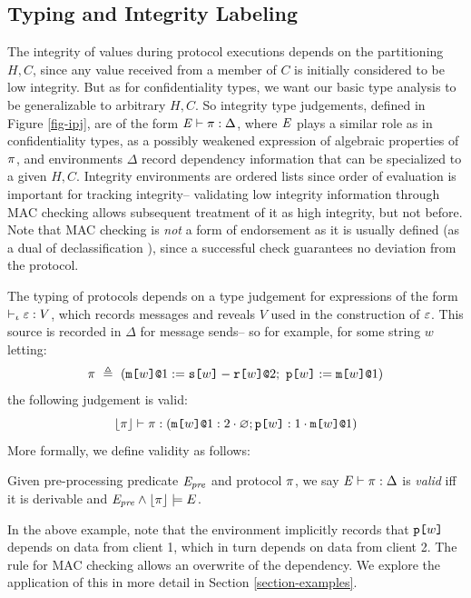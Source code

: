 \subsection{Typing and Integrity Labeling}

The integrity of values during protocol executions depends on the
partitioning $H,C$, since any value received from a member of $C$ is
initially considered to be low integrity. But as for confidentiality
types, we want our basic type analysis to be generalizable to
arbitrary $H,C$. So integrity type judgements, defined in Figure
\ref{fig-ipj}, are of the form $\mathit{E} \vdash \pi : \Delta$, where
$\mathit{E}$ plays a similar role as in confidentiality types, as a possibly
weakened expression of algebraic properties of $\pi$, and
environments $\Delta$ record dependency information that can be
specialized to a given $H,C$. Integrity environments are ordered lists
since order of evaluation is important for tracking integrity--
validating low integrity information through MAC checking allows
subsequent treatment of it as high integrity, but not before. Note
that MAC checking is \emph{not} a form of endorsement as it is usually
defined (as a dual of declassification
\cite{sabelfeld2009declassification}), since a successful check
guarantees no deviation from the protocol.

The typing of protocols depends on a type judgement for expressions
of the form $\vdash_{\iota} \varepsilon : V$, which records
messages and reveals $V$ used in the construction of $\varepsilon$.
This source is recorded in $\Delta$ for message sends-- so for
example, for some string $w$ letting:
$$
\prog\ \defeq\ (\xassign{\mx{w}{1}}{\secret{w} - \flip{w}}{2};\ \rvl{w} := \mx{w}{1})
$$
the following judgement is valid:
$$
\lfloor \pi \rfloor \vdash \pi : (\texttt{m[}w\texttt{]}\texttt{@}1 : 2 \cdot \varnothing; \texttt{p[}w\texttt{]} : 1 \cdot \texttt{m[}w\texttt{]}\texttt{@}1)
$$
More formally, we define validity as follows:
\begin{definition}
  Given pre-processing predicate $\mathit{E}_{\mathit{pre}}$ and protocol $\pi$, 
  we say $\mathit{E} \vdash \pi : \Delta$ is \emph{valid}
  iff it is derivable and $\mathit{E}_{\mathit{pre}} \wedge \lfloor \pi \rfloor \models E$.
\end{definition}

In the above example, note that the environment implicitly records
that $\texttt{p[}w\texttt{]}$ depends on data from client 1, which in turn
depends on data from client 2. The rule for MAC
checking allows an overwrite of the dependency. We explore
the application of this in more detail in Section
\ref{section-examples}.

